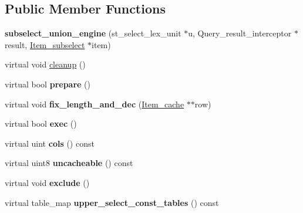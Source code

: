\subsection*{Public Member Functions}
\begin{DoxyCompactItemize}
\item 
\mbox{\label{classsubselect__union__engine_a7a76b52b2055239ef77d1f9943285c99}} 
{\bfseries subselect\+\_\+union\+\_\+engine} (st\+\_\+select\+\_\+lex\+\_\+unit $\ast$u, Query\+\_\+result\+\_\+interceptor $\ast$result, \mbox{\hyperlink{classItem__subselect}{Item\+\_\+subselect}} $\ast$item)
\item 
virtual void \mbox{\hyperlink{classsubselect__union__engine_ae433d4bdefcf00170920ace3c91332cc}{cleanup}} ()
\item 
\mbox{\label{classsubselect__union__engine_a06aa6ffd4f868d97b71abb8c867757f4}} 
virtual bool {\bfseries prepare} ()
\item 
\mbox{\label{classsubselect__union__engine_abce9accbda013defae690878ec091791}} 
virtual void {\bfseries fix\+\_\+length\+\_\+and\+\_\+dec} (\mbox{\hyperlink{classItem__cache}{Item\+\_\+cache}} $\ast$$\ast$row)
\item 
\mbox{\label{classsubselect__union__engine_a07861afb0f5903d573ea7d01c3de639c}} 
virtual bool {\bfseries exec} ()
\item 
\mbox{\label{classsubselect__union__engine_a809ccdbbc4ab715c3c56dccfe57c85ad}} 
virtual uint {\bfseries cols} () const
\item 
\mbox{\label{classsubselect__union__engine_a2ea32a1e89f3f52aab89bd430d088b47}} 
virtual uint8 {\bfseries uncacheable} () const
\item 
\mbox{\label{classsubselect__union__engine_a7609cedeef1c07569043fd20c695f251}} 
virtual void {\bfseries exclude} ()
\item 
\mbox{\label{classsubselect__union__engine_a0e552c004ec4f94315205bbdfa6fdda1}} 
virtual table\+\_\+map {\bfseries upper\+\_\+select\+\_\+const\+\_\+tables} () const
$$
\end{DoxyCompactItemize}
